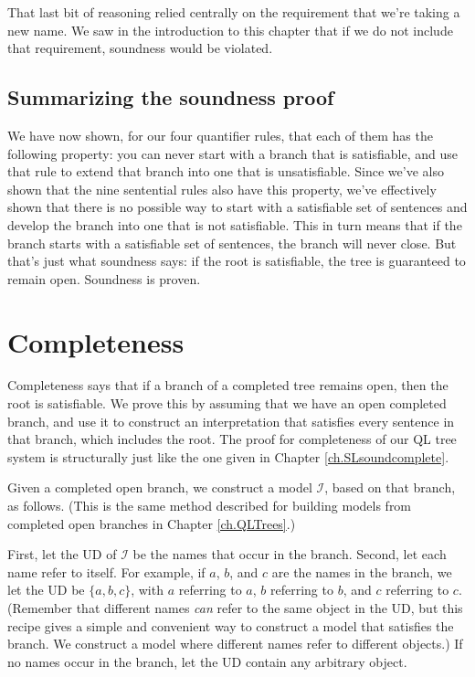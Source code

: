 That last bit of reasoning relied centrally on the requirement that we're taking a new name. We saw in the introduction to this chapter that if we do not include that requirement, soundness would be violated.

\subsection{Summarizing the soundness proof}

We have now shown, for our four quantifier rules, that each of them has the following property: you can never start with a branch that is satisfiable, and use that rule to extend that branch into one that is unsatisfiable. Since we've also shown that the nine sentential rules also have this property, we've effectively shown that there is no possible way to start with a satisfiable set of sentences and develop the branch into one that is not satisfiable. This in turn means that if the branch starts with a satisfiable set of sentences, the branch will never close. But that's just what soundness says: if the root is satisfiable, the tree is guaranteed to remain open. Soundness is proven.


\section{Completeness}

Completeness says that if a branch of a completed tree remains open, then the root is satisfiable. We prove this by assuming that we have an open completed branch, and use it to construct an interpretation that satisfies every sentence in that branch, which includes the root. The proof for completeness of our QL tree system is structurally just like the one given in Chapter \ref{ch.SLsoundcomplete}.

Given a completed open branch, we construct a model $\mathcal{I}$, based on that branch, as follows. (This is the same method described for building models from completed open branches in Chapter \ref{ch.QLTrees}.)

First, let the UD of $\mathcal{I}$ be the names that occur in the branch. Second, let each name refer to itself. For example, if $a$, $b$, and $c$ are the names in the branch, we let the UD be $\{a,b,c\}$, with $a$ referring to $a$, $b$ referring to $b$, and $c$ referring to $c$. (Remember that different names \emph{can} refer to the same object in the UD, but this recipe gives a simple and convenient way to construct a model that satisfies the branch. We construct a model where different names refer to different objects.) If no names occur in the branch, let the UD contain any arbitrary object.

